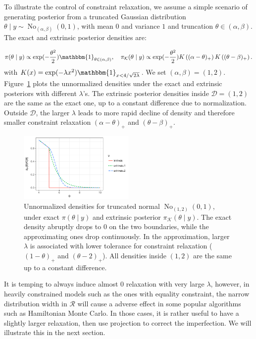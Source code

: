 \documentclass[10pt]{article}
\newcommand{\mc}[1]{\mathcal{#1}}
\DeclareMathOperator{\No}{No}
\DeclareMathOperator{\1}{\mathbbm{1}}
\begin{document}
To illustrate the control of constraint relaxation, we assume a simple scenario of generating posterior from a truncated Gaussian distribution $\theta \mid y \sim \No_{(\alpha,\beta)}(0,1)$, with mean $0$ and variance $1$ and truncation $\theta\in (\alpha,\beta)$. The exact and extrinsic posterior densities are:

$$\pi(\theta\mid y)\propto \exp(-\frac{\theta^2}{2}) \mathbbm{1}_{\theta\in(\alpha,\beta)}, \quad \pi_{\mc K}(\theta\mid y)\propto \exp(-\frac{\theta^2}{2}) K \left ( (\alpha - \theta)_+ \right) K \left ( ( \theta - \beta)_+ \right).$$
with $K(x)= \exp( - \lambda x^2)\mathbbm{1}_{x<4/\sqrt{2\lambda}}$. We set $(\alpha, \beta)=(1,2)$. Figure~\ref{truncated_normal} plots the unnormalized densities under the exact and extrinsic posteriors with different $\lambda$'s. The extrinsic posterior densities inside $\mc D = (1,2)$ are the same as the exact one, up to a constant difference due to normalization. Outside $\mc D$, the larger $\lambda$ leads to more rapid decline of density and therefore smaller constraint relaxation $(\alpha - \theta)_+ $ and $ ( \theta - \beta)_+$.

\begin{figure}[H]
 \centering
 \includegraphics[width=0.5\textwidth]{density_truncated_normal}
\caption{Unnormalized densities for truncated normal $\No_{(1,2)}(0,1)$, under exact $\pi(\theta\mid y)$ and extrinsic posterior $\pi_{\mc K}(\theta\mid y)$. The exact density abruptly drops to $0$ on the two boundaries, while the approximating ones drop continuously. In the approximation, larger $\lambda$ is associated with lower tolerance for constraint relaxation ($( 1-\theta )_+$ and $( \theta - 2)_+$). All densities inside $(1,2)$ are the same up to a constant difference.}
\label{truncated_normal}
\end{figure}

It is temping to always induce almost $0$ relaxation with very large $\lambda$, however, in heavily constrained models such as the ones with equality constraint, the narrow distribution width in $\mc R$ will cause a adverse effect in some popular algorithms such as Hamiltonian Monte Carlo. In those cases, it is rather useful to have a slightly larger relaxation, then use projection to correct the imperfection. We will illustrate this in the next section.
\end{document}
